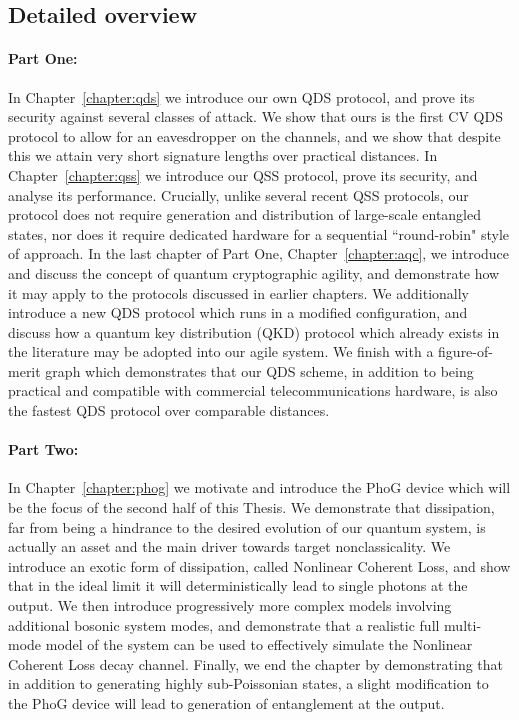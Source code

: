 \subsection*{Detailed overview}

\paragraph{Part One:} In Chapter~\ref{chapter:qds} we introduce our own QDS protocol, and prove its security against several classes of attack. We show that ours is the first CV QDS protocol to allow for an eavesdropper on the channels, and we show that despite this we attain very short signature lengths over practical distances. In Chapter~\ref{chapter:qss} we introduce our QSS protocol, prove its security, and analyse its performance. Crucially, unlike several recent QSS protocols, our protocol does not require generation and distribution of large-scale entangled states, nor does it require dedicated hardware for a sequential ``round-robin" style of approach. In the last chapter of Part One, Chapter~\ref{chapter:aqc}, we introduce and discuss the concept of quantum cryptographic agility, and demonstrate how it may apply to the protocols discussed in earlier chapters. We additionally introduce a new QDS protocol which runs in a modified configuration, and discuss how a quantum key distribution (QKD) protocol which already exists in the literature may be adopted into our agile system. We finish with a figure-of-merit graph which demonstrates that our QDS scheme, in addition to being practical and compatible with commercial telecommunications hardware, is also the fastest QDS protocol over comparable distances. 

\paragraph{Part Two:} In Chapter~\ref{chapter:phog} we motivate and introduce the PhoG device which will be the focus of the second half of this Thesis. We demonstrate that dissipation, far from being a hindrance to the desired evolution of our quantum system, is actually an asset and the main driver towards target nonclassicality. We introduce an exotic form of dissipation, called Nonlinear Coherent Loss, and show that in the ideal limit it will deterministically lead to single photons at the output. We then introduce progressively more complex models involving additional bosonic system modes, and demonstrate that a realistic full multi-mode model of the system can be used to effectively simulate the Nonlinear Coherent Loss decay channel. Finally, we end the chapter by demonstrating that in addition to generating highly sub-Poissonian states, a slight modification to the PhoG device will lead to generation of entanglement at the output.

